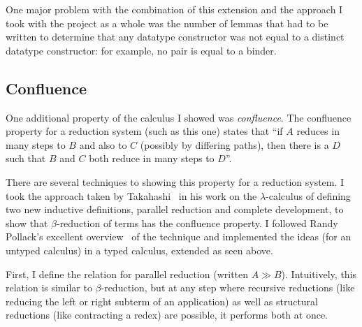 One major problem with the combination of this extension and the approach I took with the project as a whole was the number of lemmas that had to be written to determine that any datatype constructor was not equal to a distinct datatype constructor: for example, no pair is equal to a binder.

\subsection{Confluence}
One additional property of the calculus I showed was \emph{confluence}.
The confluence property for a reduction system (such as this one) states that ``if \(A\) reduces in many steps to \(B\) and also to \(C\) (possibly by differing paths), then there is a \(D\) such that \(B\) and \(C\) both reduce in many steps to \(D\)''.

There are several techniques to showing this property for a reduction system.
I took the approach taken by Takahashi~\cite{Takahashi} in his work on the \(\lambda\)-calculus of defining two new inductive definitions, parallel reduction and complete development, to show that \(\beta\)-reduction of terms has the confluence property.
I followed Randy Pollack's excellent overview~\cite{pollack} of the technique and implemented the ideas (for an untyped calculus) in a typed calculus, extended as seen above.

First, I define the relation for parallel reduction (written \(A \gg B\)).
Intuitively, this relation is similar to \(\beta\)-reduction, but at any step where recursive reductions (like reducing the left or right subterm of an application) as well as structural reductions (like contracting a redex) are possible, it performs both at once.

